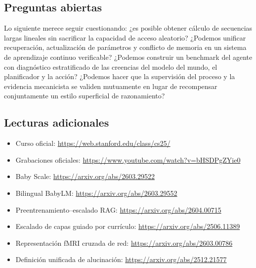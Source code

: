 \documentclass[a4paper]{article}
\begin{document}
\subsection{Preguntas abiertas}

Lo siguiente merece seguir cuestionando: ¿es posible obtener cálculo de secuencias largas lineales sin sacrificar la capacidad de acceso aleatorio? ¿Podemos unificar recuperación, actualización de parámetros y conflicto de memoria en un sistema de aprendizaje continuo verificable? ¿Podemos construir un benchmark del agente con diagnóstico estratificado de las creencias del modelo del mundo, el planificador y la acción? ¿Podemos hacer que la supervisión del proceso y la evidencia mecanicista se validen mutuamente en lugar de recompensar conjuntamente un estilo superficial de razonamiento?

\subsection{Lecturas adicionales}

\begin{itemize}
  \item Curso oficial: \url{https://web.stanford.edu/class/cs25/}
  \item Grabaciones oficiales: \url{https://www.youtube.com/watch?v=bHSDPgZYie0}
  \item Baby Scale: \url{https://arxiv.org/abs/2603.29522}
  \item Bilingual BabyLM: \url{https://arxiv.org/abs/2603.29552}
  \item Preentrenamiento--escalado RAG: \url{https://arxiv.org/abs/2604.00715}
  \item Escalado de capas guiado por currículo: \url{https://arxiv.org/abs/2506.11389}
  \item Representación fMRI cruzada de red: \url{https://arxiv.org/abs/2603.00786}
  \item Definición unificada de alucinación: \url{https://arxiv.org/abs/2512.21577}
\end{itemize}
\end{document}
